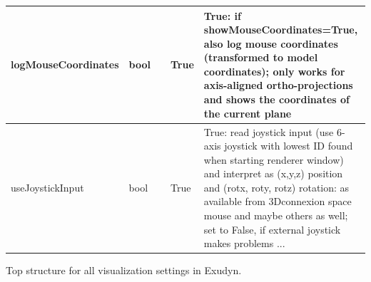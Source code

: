 \begin{center}
\begin{longtable}{| p{4.2cm} | p{2.5cm} | p{0.3cm} | p{3.0cm} | p{6cm} |}
    logMouseCoordinates &     bool &      &     True &     True: if showMouseCoordinates=True, also log mouse coordinates (transformed to model coordinates); only works for axis-aligned ortho-projections and shows the coordinates of the current plane\\ \hline
    useJoystickInput &     bool &      &     True &     True: read joystick input (use 6-axis joystick with lowest ID found when starting renderer window) and interpret as (x,y,z) position and (rotx, roty, rotz) rotation: as available from 3Dconnexion space mouse and maybe others as well; set to False, if external joystick makes problems ...\\ \hline
	  \end{longtable}
	\end{center}



\label{sec:VisualizationSettings}
Top structure for all visualization settings in Exudyn. 

